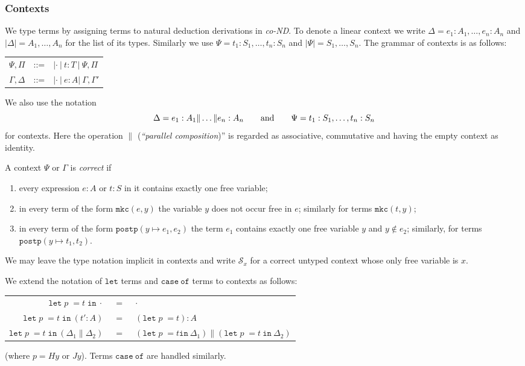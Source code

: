 \subsubsection{Contexts}
We type terms by assigning terms to natural deduction derivations in \emph{co-ND}. To denote a linear context 
we write $\Delta = e_1: A_1, \ldots, e_n: A_n$  and $|\Delta| = A_1, \ldots, A_n$ for the list of its types. 
Similarly we use $\Psi = t_1: S_1, \ldots, t_n: S_n$  and $|\Psi| = S_1, \ldots, S_n$. 
The grammar of contexts is 
as follows:
\begin{center}
   \begin{tabular}{rcl}
$\Psi, \Pi$ \qquad & ::= & $| \cdot\ |\ t : T\ |\ \Psi, \Pi$\\
$\Gamma, \Delta$\qquad&  ::= & $|\cdot\ |\ e: A |\ \Gamma, \Gamma'$\\
\end{tabular}
\end{center}
We also use the notation 
\[
\Delta = e_1: A_1\| \ldots \| e_n: A_n\qquad \hbox{and}\qquad \Psi = t_1: S_1, \ldots, t_n: S_n
\]
for contexts. Here the operation $\|$ (\emph{``parallel composition})'' is regarded as associative, commutative and 
having the empty context as identity. 
\begin{definition}
A context $\Psi$ or $\Gamma$ is \emph{correct} if 
\begin{enumerate}
\item every expression $e:A$ or $t: S$ in it contains exactly one free variable;
\item in every term of the form $\mathtt{mkc}(e, y)$ the variable $y$ does not occur free in $e$; 
similarly for terms $\mathtt{mkc}(t, y)$;
\item in every term of the form $\mathtt{postp}(y\mapsto e_1, e_2)$ the term 
$e_1$ contains exactly one free variable $y$ and $y \notin e_2$; similarly, for terms 
$\mathtt{postp}(y\mapsto t_1, t_2)$.  
\end{enumerate}
\end{definition}
We may leave the type notation implicit in contexts and write $\mathcal{S}_x$ for a correct untyped context whose only free
variable is $x$.

\vspace{1ex}

\noindent
We extend the notation of $\mathtt{let}$ terms and $\mathtt{case\ of}$ terms to contexts as follows: 
\begin{center}
\begin{tabular}{rcl}
$\mathtt{let}\; p\; = t\; \mathtt{in}\ \cdot$ &\ =\ & $\cdot$\\
$\mathtt{let}\; p\; = t\; \mathtt{in}\ (t': A)$ &\ =\ & $(\mathtt{let}\; p\; = t) : A$\\
$\mathtt{let}\; p\; = t\; \mathtt{in}\ (\Delta_1\|\Delta_2)$ &\ =\ & 
$(\mathtt{let}\; p\; = t \mathtt{in}\ \Delta_1)\| (\mathtt{let}\; p\; = t\ \mathtt{in}\ \Delta_2)$
\end{tabular}
\end{center}
(where $p = Hy$ or $Jy$). Terms $\mathtt{case\ of}$ are handled similarly. 

